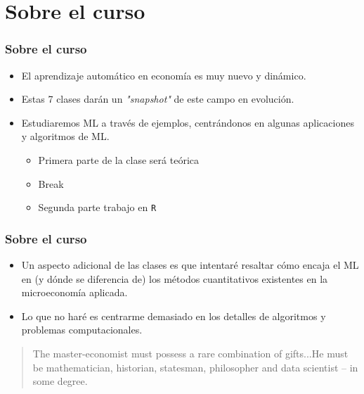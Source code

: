 \documentclass[
  shownotes,
  xcolor={svgnames},
  hyperref={colorlinks,citecolor=DarkBlue,linkcolor=DarkRed,urlcolor=DarkBlue}
  , aspectratio=169]{beamer}
\begin{document}
\section{Sobre el curso}
 \begin{frame}[noframenumbering]
\tableofcontents[currentsubsection]

\end{frame}
\begin{frame}
\frametitle{Sobre el curso}


\begin{itemize}

  \item El aprendizaje automático en economía es muy nuevo y dinámico. 
  \medskip
  \item Estas 7 clases darán un {\it "snapshot"} de este campo en evolución.
  \medskip
  \item Estudiaremos ML a través de ejemplos, centrándonos en algunas aplicaciones y algoritmos de ML.
  \medskip
  \begin{itemize}
  \item Primera parte de la clase será teórica
  \medskip
  \item Break
  \medskip
  \item Segunda parte trabajo en \texttt{R}
  \end{itemize}
\end{itemize}

\end{frame}
\begin{frame}

\frametitle{Sobre el curso}
\begin{itemize}
  \medskip
  \item Un aspecto adicional de las clases es que intentaré resaltar cómo encaja el ML en (y dónde se diferencia de) los métodos cuantitativos existentes en la microeconomía aplicada.
  \medskip
  \item Lo que no haré es centrarme demasiado en los detalles de algoritmos y problemas computacionales.
  \medskip

\end{itemize}

\begin{quote}
The master-economist must possess a rare combination of gifts...He must be mathematician, historian, statesman, philosopher and \textcolor{andesred}{data scientist} – in some degree.
\end{quote}

\end{frame}
\end{document}
